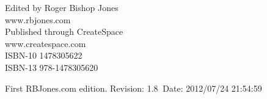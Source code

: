 \renewcommand{\chaptername}{Volume}

\renewcommand{\thechapter}{\arabic{chapter}}
\renewcommand{\thesection}{Book \Roman{section}}
\renewcommand{\thesubsection}{Part \arabic{subsection}}

\addtolength{\cftchapnumwidth}{4em}
\addtolength{\cftsecnumwidth}{2.5em}
\addtolength{\cftsubsecnumwidth}{0.5em}
\cftsetpnumwidth{2em}

\frontmatter

\begin{titlepage}
\maketitle

\hspace{2in}

\vfill

\begin{centering}




\vfill

\vspace{0.1in}
Edited by Roger Bishop Jones\\
www.rbjones.com\\
\vspace{0.2in}
Published through CreateSpace\\
www.createspace.com\\
\vspace{0.2in}
ISBN-10 1478305622\\
ISBN-13 978-1478305620\\
\vspace{0.2in}

{\footnotesize

First RBJones.com edition. $ $Revision: 1.8 $~$Date: 2012/07/24 21:54:59 $ $


}%

\end{centering}


\thispagestyle{empty}
\end{titlepage}

